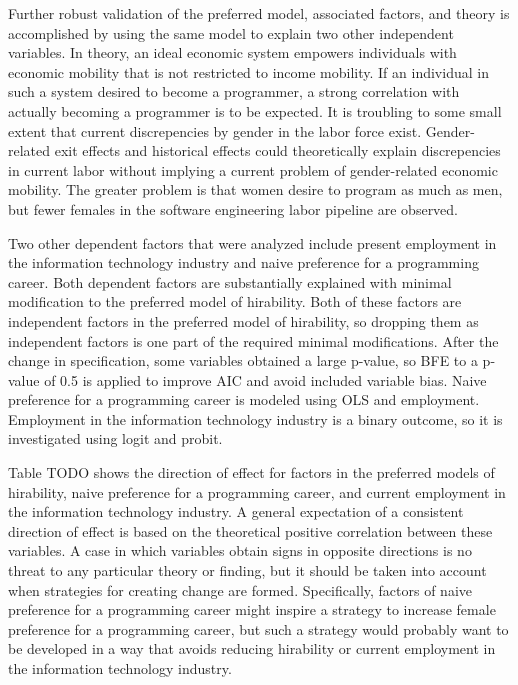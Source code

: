\documentclass[review]{elsarticle}
\begin{document}
Further robust validation of the preferred model, associated factors, and theory
is accomplished by using the same model to explain two other independent variables.
In theory, an ideal economic system empowers individuals with economic mobility that is not restricted to income mobility.
If an individual in such a system desired to become a programmer,
a strong correlation with actually becoming a programmer is to be expected.
It is troubling to some small extent that current discrepencies by gender in the labor force exist.
Gender-related exit effects and historical effects could theoretically explain discrepencies in current labor without implying
a current problem of gender-related economic mobility.
The greater problem is that women desire to program as much as men, but fewer females in the software engineering labor pipeline are observed.

Two other dependent factors that were analyzed include present employment in the information technology industry
and naive preference for a programming career.
Both dependent factors are substantially explained with minimal modification to the preferred model of hirability.
Both of these factors are independent factors in the preferred model of hirability,
so dropping them as independent factors is one part of the required minimal modifications.
After the change in specification, some variables obtained a large p-value, so BFE to a p-value of 0.5 is applied
to improve AIC and avoid included variable bias.
Naive preference for a programming career is modeled using OLS and employment.
Employment in the information technology industry is a binary outcome, so it is investigated using logit and probit.

Table TODO shows the direction of effect for factors in the preferred models of hirability,
naive preference for a programming career,
and current employment in the information technology industry.
A general expectation of a consistent direction of effect is based on the theoretical positive correlation between these variables.
A case in which variables obtain signs in opposite directions is no threat to any particular theory or finding,
but it should be taken into account when strategies for creating change are formed.
Specifically, factors of naive preference for a programming career
might inspire a strategy to increase female preference for a programming career,
but such a strategy would probably want to be developed in a way that avoids reducing hirability or current employment in the information technology industry.
\end{document}
